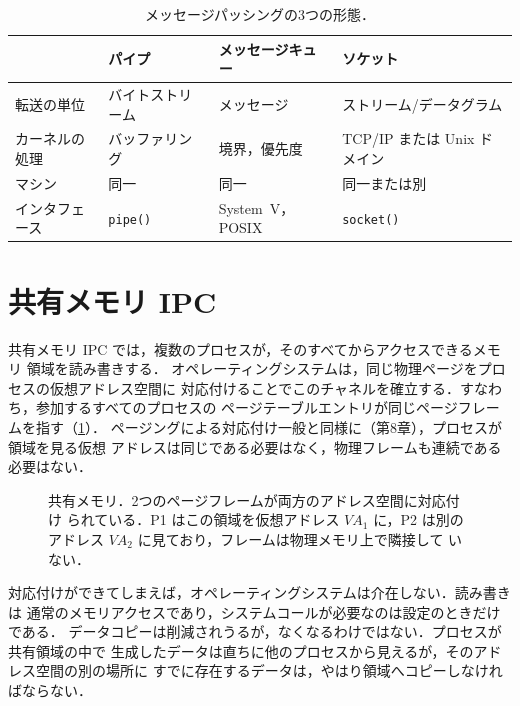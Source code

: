 \documentclass[../main.tex]{subfiles}
\begin{document}
\begin{table}[htbp]
  \centering
  \caption{メッセージパッシングの3つの形態．}
  \label{tab:l09-forms}
  \small
  \setlength{\tabcolsep}{4pt}%
  \begin{tabular}{@{}llll@{}}
    \toprule
    & パイプ & メッセージキュー & ソケット \\
    \midrule
    転送の単位 & バイトストリーム & メッセージ & ストリーム/データグラム \\
    カーネルの処理 & バッファリング & 境界，優先度 & TCP/IP または Unix ドメイン \\
    マシン & 同一 & 同一 & 同一または別 \\
    インタフェース & \texttt{pipe()} & System~V，POSIX & \texttt{socket()} \\
    \bottomrule
  \end{tabular}
\end{table}

\section{共有メモリ IPC}
\label{sec:l09-shm}

共有メモリ IPC では，複数のプロセスが，そのすべてからアクセスできるメモリ
領域を読み書きする．%
オペレーティングシステムは，同じ物理ページをプロセスの仮想アドレス空間に
対応付けることでこのチャネルを確立する．すなわち，参加するすべてのプロセスの
ページテーブルエントリが同じページフレームを指す（\cref{fig:l09-shm-mapping}）．
ページングによる対応付け一般と同様に（第8章），プロセスが領域を見る仮想
アドレスは同じである必要はなく，物理フレームも連続である必要はない．%

\begin{figure}[htbp]
  \centering
  
  \caption{共有メモリ．2つのページフレームが両方のアドレス空間に対応付け
    られている．P1 はこの領域を仮想アドレス $\mathit{VA}_1$ に，P2 は別の
    アドレス $\mathit{VA}_2$ に見ており，フレームは物理メモリ上で隣接して
    いない．}
  \label{fig:l09-shm-mapping}
\end{figure}

対応付けができてしまえば，オペレーティングシステムは介在しない．読み書きは
通常のメモリアクセスであり，システムコールが必要なのは設定のときだけである．
データコピーは削減されうるが，なくなるわけではない．プロセスが共有領域の中で
生成したデータは直ちに他のプロセスから見えるが，そのアドレス空間の別の場所に
すでに存在するデータは，やはり領域へコピーしなければならない．
\end{document}
